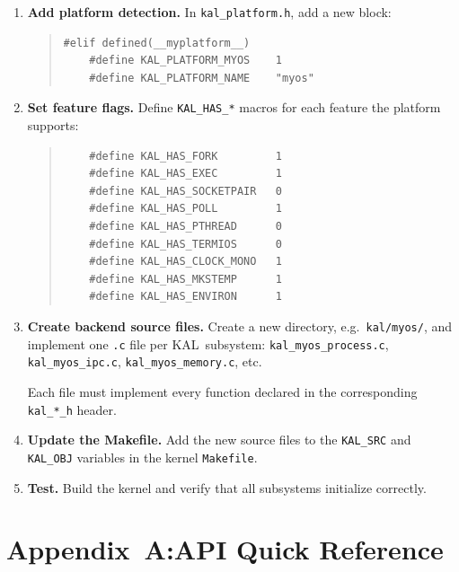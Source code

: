 \documentclass[11pt,twoside]{article}
\newcommand{\KAL}{KAL}
\begin{document}
\begin{enumerate}
  \item {\bf Add platform detection.}
        In {\tt kal\_platform.h}, add a new block:
\begin{quote}
\begin{verbatim}
#elif defined(__myplatform__)
    #define KAL_PLATFORM_MYOS    1
    #define KAL_PLATFORM_NAME    "myos"
\end{verbatim}
\end{quote}

  \item {\bf Set feature flags.}
        Define {\tt KAL\_HAS\_*} macros for each feature the
        platform supports:
\begin{quote}
\begin{verbatim}
    #define KAL_HAS_FORK         1
    #define KAL_HAS_EXEC         1
    #define KAL_HAS_SOCKETPAIR   0
    #define KAL_HAS_POLL         1
    #define KAL_HAS_PTHREAD      0
    #define KAL_HAS_TERMIOS      0
    #define KAL_HAS_CLOCK_MONO   1
    #define KAL_HAS_MKSTEMP      1
    #define KAL_HAS_ENVIRON      1
\end{verbatim}
\end{quote}

  \item {\bf Create backend source files.}
        Create a new directory, e.g.\ {\tt kal/myos/}, and implement
        one {\tt .c} file per \KAL\ subsystem:
        {\tt kal\_myos\_process.c},
        {\tt kal\_myos\_ipc.c},
        {\tt kal\_myos\_memory.c}, etc.

        Each file must implement every function declared in the
        corresponding {\tt kal\_*\_h} header.

  \item {\bf Update the Makefile.}
        Add the new source files to the {\tt KAL\_SRC} and
        {\tt KAL\_OBJ} variables in the kernel {\tt Makefile}.

  \item {\bf Test.}
        Build the kernel and verify that all subsystems initialize
        correctly.
\end{enumerate}

\newpage
\section*{Appendix~A:\quad API Quick Reference}
\end{document}
